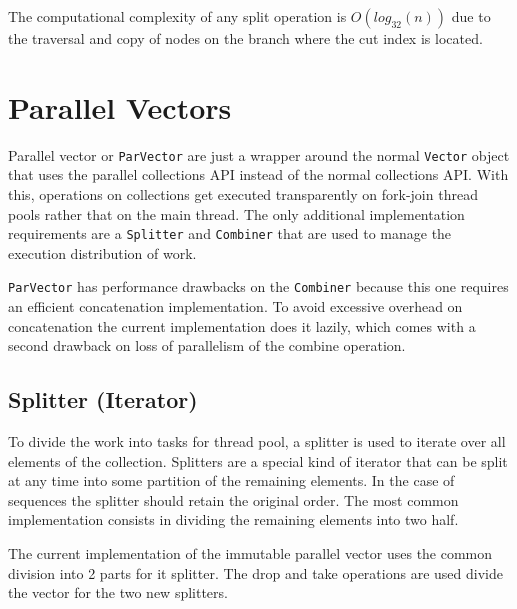 The computational complexity of any split operation is $O(log_{32}(n))$ due to the traversal and copy of nodes on the branch where the cut index is located.



\section{Parallel Vectors}
Parallel vector or \texttt{ParVector} are just a wrapper around the normal \texttt{Vector} object that uses the parallel collections API instead of the normal collections API. With this, operations on collections get executed transparently on fork-join thread pools rather that on the main thread. The only additional implementation requirements are a \texttt{Splitter} and \texttt{Combiner} that are used to manage the execution distribution of work. 

\texttt{ParVector} has performance drawbacks on the \texttt{Combiner} because this one requires an efficient concatenation implementation. To avoid excessive overhead on concatenation the current implementation does it lazily, which comes with a second drawback on loss of parallelism of the combine operation.


\subsection{Splitter (Iterator)}
To divide the work into tasks for thread pool, a splitter is used to iterate over all elements of the collection. Splitters are a special kind of iterator that can be split at any time into some partition of the remaining elements. In the case of sequences the splitter should retain the original order. The most common implementation consists in dividing the remaining elements into two half. 

The current implementation of the immutable parallel  vector \cite{scalaParVector211}  uses the common division into 2 parts for it splitter. The drop and take operations are used divide the vector for the two new splitters.

